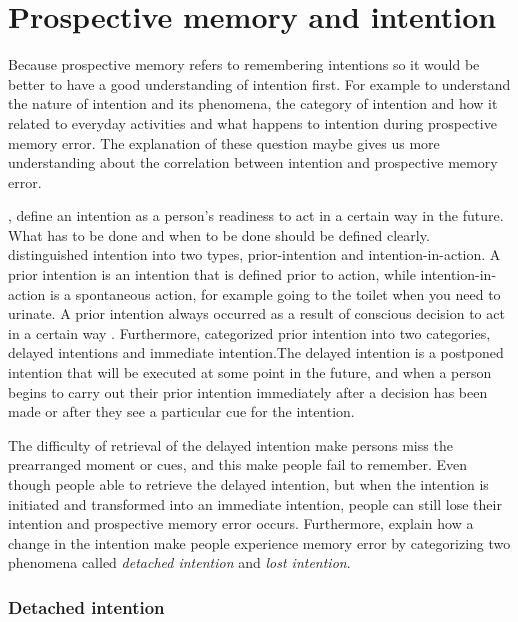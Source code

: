 \section{Prospective memory and intention}
Because prospective memory refers to remembering intentions so it would be better to have a good understanding of intention first. For example to understand the nature of intention and its
phenomena, the category of intention and how it related to everyday activities and what happens to intention during prospective memory error. The explanation of these question maybe gives us more understanding about the correlation between intention and prospective memory error.

\cite{LiaKvavilashviliAndJudiEllis}, \cite{gauld1977human} define an intention as a person's readiness to act in a certain way in the future. What has to be done and when to be done should be defined clearly.
\cite{searle1983intentionality} distinguished intention into two types, prior-intention and intention-in-action. A prior intention is an intention that is defined prior to action, while intention-in-action is a spontaneous action, for example going to the toilet when you need to urinate. A prior intention always occurred as a result of conscious decision to act in a certain way \citep{Heckhausen1985-HECFWT}. Furthermore, \cite{gauld1977human} categorized prior intention into two categories, delayed intentions and immediate intention.The delayed intention is a postponed intention that will be executed at some point in the future, and when a person begins to carry out their prior intention immediately after a decision has been made or after they see a particular cue for the intention.


The difficulty of retrieval of the delayed intention make persons miss the prearranged moment or cues, and this make people fail to remember. Even though people able to retrieve the delayed intention, but when the intention is initiated and transformed into an immediate intention,  people can still lose their intention and prospective memory error occurs.
Furthermore, \cite{Reason1984} explain how a change in the intention make people experience memory error by categorizing two phenomena called \textit{detached intention} and \textit{lost intention}.

\subsubsection{Detached intention}

